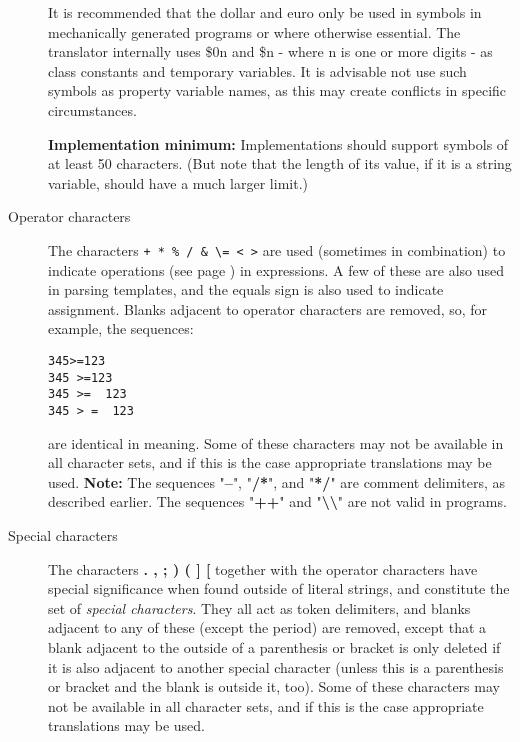 \begin{description}
It is recommended that the dollar and euro only be used in symbols in
mechanically generated programs or where otherwise essential. The \nr{} translator 
internally uses \$0n and \$n - where n is one or more digits - as class constants and 
temporary variables. It is advisable not use such symbols as property variable names,
as this may create conflicts in specific circumstances.

\textbf{Implementation minimum:} Implementations should support
symbols of at least 50 characters.
(But note that the length of its value, if it is a string variable,
should have a much larger limit.)
\item[Operator characters]\label{refopers}

The characters \texttt{+ \textendash \-  * \% \textbar / \& \textbackslash = < >}
are used (sometimes in combination) to indicate
 operations (see page \pageref{refops})  in expressions.
A few of these are also used in parsing templates, and the equals sign
is also used to indicate assignment.
Blanks adjacent to operator characters are removed, so, for example,
the sequences:
\begin{lstlisting}
345>=123
345 >=123
345 >=  123
345 > =  123
\end{lstlisting}
are identical in meaning.
 Some of these characters may not be available in all character sets,
and if this is the case appropriate translations may be used.
\textbf{Note: }The sequences "\textbf{--}", "\textbf{/*}", and
"\textbf{*/}" are comment delimiters, as described earlier.
The sequences "\textbf{++}"
and "\textbf{\textbackslash \textbackslash }" are not valid in \nr{}
programs.
\item[Special characters]\label{refspecs}

The characters  \textbf{.  ,  ;  )  (  ]  [}  together
with the operator characters have special significance when found
outside of literal strings, and constitute the set of \emph{special
characters}.
They all act as token delimiters, and blanks adjacent to any of these
(except the period) are removed, except that a blank adjacent to the
outside of a parenthesis or bracket is only deleted if it is also
adjacent to another special character (unless this is a parenthesis or
bracket and the blank is outside it, too).
 Some of these characters may not be available in all character sets,
and if this is the case appropriate translations may be used.
\end{description}
